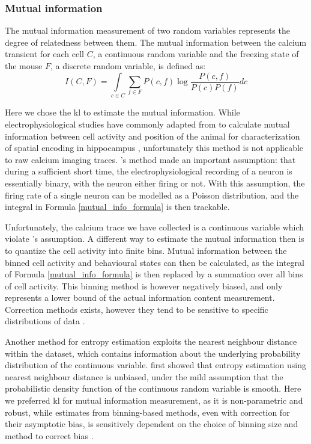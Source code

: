 \subsubsection{Mutual information}

The mutual information measurement of two random variables represents the degree of relatedness between them. The mutual information between the calcium transient for each cell $C$, a continuous random variable and the freezing state of the mouse $F$, a discrete random variable, is defined as:
\begin{equation} \label{mutual_info_formula}
    I(C, F) = \int\limits_{c \in C} \sum_{f \in F} P(c,f)\log\frac{P(c,f)}{P(c)P(f)}dc
\end{equation}

Here we chose the \gls{kl} to estimate the mutual information. While electrophysiological studies have commonly adapted from \citet{skaggs93} to calculate mutual information between cell activity and position of the animal for characterization of spatial encoding in hippocampus \citep[e.g.,][]{knierim95, skaggs96, ji07, cheng13, roux17}, unfortunately this method is not applicable to raw calcium imaging traces. \citet{skaggs93}'s method made an important assumption: that during a sufficient short time, the electrophysiological recording of a neuron is essentially binary, with the neuron either firing or not. With this assumption, the firing rate of a single neuron can be modelled as a Poisson distribution, and the integral in Formula \ref{mutual_info_formula} is then trackable.

Unfortunately, the calcium trace we have collected is a continuous variable which violate \citet{skaggs93}'s assumption. A different way to estimate the mutual information then is to quantize the cell activity into finite bins. Mutual information between the binned cell activity and behavioural states can then be calculated, as the integral of Formula \ref{mutual_info_formula} is then replaced by a summation over all bins of cell activity. This binning method is however negatively biased, and only represents a lower bound of the actual information content measurement. Correction methods exists, however they tend to be sensitive to specific distributions of data \citep{paninski03}.

Another method for entropy estimation exploits the nearest neighbour distance within the dataset, which contains information about the underlying probability distribution of the continuous variable. \citet{kozachenko87} first showed that entropy estimation using nearest neighbour distance is unbiased, under the mild assumption that the probabilistic density function of the continuous random variable is smooth. Here we preferred \gls{kl} for mutual information measurement, as it is non-parametric and robust, while estimates from binning-based methods, even with correction for their asymptotic bias, is sensitively dependent on the choice of binning size and method to correct bias \citep{victor02, ross14}. 

